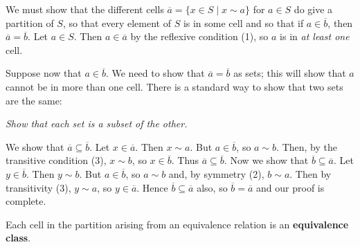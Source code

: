 \documentclass[11pt,oneside]{article}
\begin{document}
\begin{BookBody}
 We must show that the different cells $\overline{a}=\{x\in S\mid x\sim a\}$ for $a\in S$ do give a partition of $S$, so that every element of $S$ is in some cell and so that if $a\in\overline{b}$, then $\overline{a}=\overline{b}$. Let $a\in S$. Then $a\in\overline{a}$ by the reflexive condition (1), so $a$ is in \textit{at least one} cell.

Suppose now that $a\in\overline{b}$. We need to show that $\overline{a}=\overline{b}$ as sets; this will show that $a$ cannot be in more than one cell. There is a standard way to show that two sets are the same:
\begin{center}\textit{Show that each set is a subset of the other.}\end{center}
\noindent We show that $\overline{a}\subseteq\overline{b}$. Let $x\in\overline{a}$. Then $x\sim a$. But $a\in\overline{b}$, so $a\sim b$. Then, by the transitive condition (3), $x\sim b$, so $x\in\overline{b}$. Thus $\overline{a}\subseteq\overline{b}$. Now we show that $\overline{b}\subseteq\overline{a}$. Let $y\in\overline{b}$. Then $y\sim b$. But $a\in\overline{b}$, so $a\sim b$ and, by symmetry (2), $b\sim a$. Then by transitivity (3), $y\sim a$, so $y\in\overline{a}$. Hence $\overline{b}\subseteq\overline{a}$ also, so $\overline{b}=\overline{a}$ and our proof is complete.\BookEnd{\blacklozenge}

Each cell in the partition arising from an equivalence relation is an\textbf{ equivalence} \textbf{class}.

\end{BookBody}

\BookNarrativefalse
\end{document}
